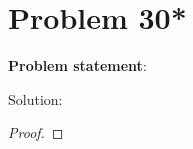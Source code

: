 \documentclass{article} %
\begin{document}
\newpage

\section*{Problem 30*}


\textbf{Problem statement}: 

Solution: 
\begin{addmargin}[1em]{0em}
\begin{proof}

\end{proof}
\end{addmargin}

\newpage
\end{document}
